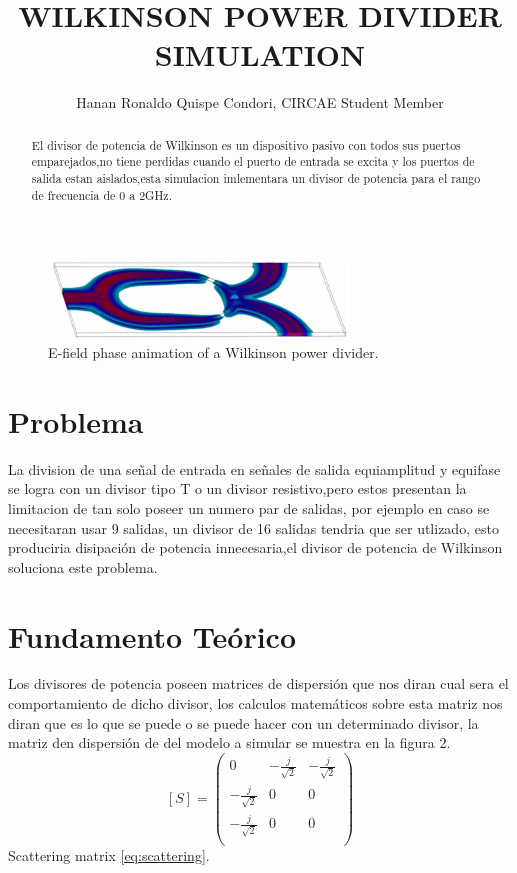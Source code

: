 \documentclass[a4paper]{IEEEtran} %
\begin{document}
\tableofcontents
\listoffigures
\title{WILKINSON POWER DIVIDER SIMULATION}
\author{Hanan Ronaldo Quispe Condori, CIRCAE Student Member}
\maketitle
\begin{abstract}
El divisor de potencia de Wilkinson es un dispositivo pasivo con todos sus puertos emparejados,no tiene perdidas cuando el puerto de entrada se excita y los puertos de salida estan aislados,esta simulacion imlementara un divisor de potencia para el rango de frecuencia de 0 a 2GHz.
\end{abstract}
\begin{figure}[h]
    \centering
        \includegraphics[width=8cm]{imagenes/img2}
        \caption{E-field phase animation of a Wilkinson power divider.}
        \label{fig: E-field phase animation of a Wilkinson power divider.}
\end{figure}
\section{Problema}
\label{sec:Problem}
La division de una señal de entrada en señales de salida equiamplitud y equifase se logra con un divisor tipo T o un divisor resistivo,pero estos presentan la limitacion de tan solo poseer un numero par de salidas, por ejemplo en caso se necesitaran usar 9 salidas, un divisor de 16 salidas tendria que ser utlizado, esto produciria disipación de potencia innecesaria,el divisor de potencia de Wilkinson soluciona este problema.
\section{Fundamento Teórico}
\label{sec:fundamento}
Los divisores de potencia poseen matrices de dispersión que nos diran cual sera el comportamiento de dicho divisor, los calculos matemáticos sobre esta matriz nos diran que es lo que se puede o se puede hacer con un determinado divisor, la matriz den dispersión de del modelo a simular se muestra en la figura 2.\\
\begin{equation}
\label{eq:scattering}
[S]=
\begin{pmatrix}
0&-\frac{j}{\sqrt{2}}&-\frac{j}{\sqrt{2}}\\
-\frac{j}{\sqrt{2}}&0&0\\
-\frac{j}{\sqrt{2}}&0&0\\
\end{pmatrix}
\end{equation}
Scattering matrix \ref{eq:scattering}.
\end{document}
